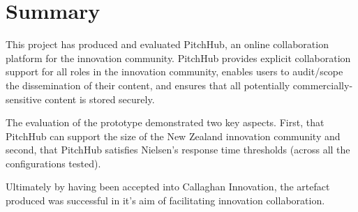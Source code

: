 \section{Summary}

This project has produced and evaluated PitchHub, an online collaboration platform for the innovation community. PitchHub provides explicit collaboration support for all roles in the innovation community, enables users to audit/scope the dissemination of their content, and ensures that all potentially commercially-sensitive content is stored securely.

The evaluation of the prototype demonstrated two key aspects. First, that PitchHub can support the size of the New Zealand innovation community and second, that PitchHub satisfies Nielsen's response time thresholds (across all the configurations tested). 

Ultimately by having been accepted into Callaghan Innovation, the artefact produced was successful in it's aim of facilitating innovation collaboration.